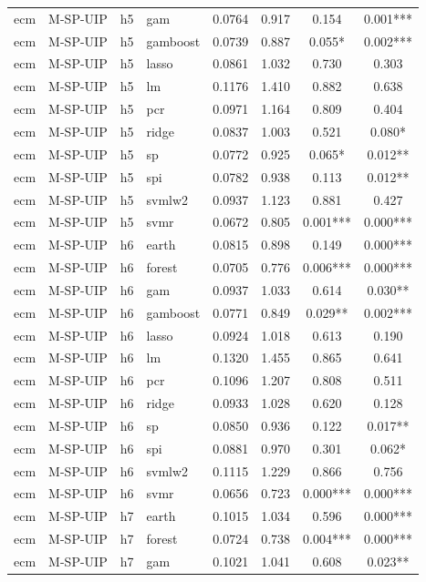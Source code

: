 \begin{ThreePartTable}
\begin{longtable}[t]{llclcccc}
ecm & M-SP-UIP & h5 & gam & 0.0764 & 0.917 & 0.154 & 0.001***\\
ecm & M-SP-UIP & h5 & gamboost & 0.0739 & 0.887 & 0.055* & 0.002***\\
ecm & M-SP-UIP & h5 & lasso & 0.0861 & 1.032 & 0.730 & 0.303\\
ecm & M-SP-UIP & h5 & lm & 0.1176 & 1.410 & 0.882 & 0.638\\
ecm & M-SP-UIP & h5 & pcr & 0.0971 & 1.164 & 0.809 & 0.404\\
ecm & M-SP-UIP & h5 & ridge & 0.0837 & 1.003 & 0.521 & 0.080*\\
ecm & M-SP-UIP & h5 & sp & 0.0772 & 0.925 & 0.065* & 0.012**\\
ecm & M-SP-UIP & h5 & spi & 0.0782 & 0.938 & 0.113 & 0.012**\\
ecm & M-SP-UIP & h5 & svmlw2 & 0.0937 & 1.123 & 0.881 & 0.427\\
ecm & M-SP-UIP & h5 & svmr & 0.0672 & 0.805 & 0.001*** & 0.000***\\
\addlinespace
ecm & M-SP-UIP & h6 & earth & 0.0815 & 0.898 & 0.149 & 0.000***\\
ecm & M-SP-UIP & h6 & forest & 0.0705 & 0.776 & 0.006*** & 0.000***\\
ecm & M-SP-UIP & h6 & gam & 0.0937 & 1.033 & 0.614 & 0.030**\\
ecm & M-SP-UIP & h6 & gamboost & 0.0771 & 0.849 & 0.029** & 0.002***\\
ecm & M-SP-UIP & h6 & lasso & 0.0924 & 1.018 & 0.613 & 0.190\\
ecm & M-SP-UIP & h6 & lm & 0.1320 & 1.455 & 0.865 & 0.641\\
ecm & M-SP-UIP & h6 & pcr & 0.1096 & 1.207 & 0.808 & 0.511\\
ecm & M-SP-UIP & h6 & ridge & 0.0933 & 1.028 & 0.620 & 0.128\\
ecm & M-SP-UIP & h6 & sp & 0.0850 & 0.936 & 0.122 & 0.017**\\
ecm & M-SP-UIP & h6 & spi & 0.0881 & 0.970 & 0.301 & 0.062*\\
ecm & M-SP-UIP & h6 & svmlw2 & 0.1115 & 1.229 & 0.866 & 0.756\\
ecm & M-SP-UIP & h6 & svmr & 0.0656 & 0.723 & 0.000*** & 0.000***\\
\addlinespace
ecm & M-SP-UIP & h7 & earth & 0.1015 & 1.034 & 0.596 & 0.000***\\
ecm & M-SP-UIP & h7 & forest & 0.0724 & 0.738 & 0.004*** & 0.000***\\
ecm & M-SP-UIP & h7 & gam & 0.1021 & 1.041 & 0.608 & 0.023**\\

\end{longtable}
\end{ThreePartTable}
